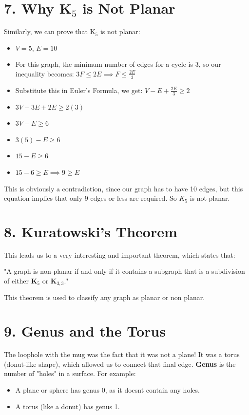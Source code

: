 \documentclass[12pt]{exam}
\begin{document}
\section*{7. Why K$_5$ is Not Planar}
Similarly, we can prove that K$_5$ is not planar:
\begin{itemize}
    \item $V = 5$, $E = 10$
    \item For this graph, the minimum number of edges for a cycle is 3, so our inequality becomes: $3F \leq 2E \implies F \leq \frac{2E}{3}$
    \item Substitute this in Euler's Formula, we get: $V - E + \frac{2E}{3} \geq 2$
    \item $3V - 3E + 2E \geq 2(3)$
    \item $3V - E \geq 6$
    \item $3(5) - E \geq 6$
    \item $15 - E \geq 6$
    \item $15 - 6 \geq E \implies 9 \geq E$
\end{itemize}
This is obviously a contradiction, since our graph has to have 10 edges, but this equation implies that only 9 edges or less are required. So $K_5$ is not planar.

\section*{8. Kuratowski's Theorem}
This leads us to a very interesting and important theorem, which states that:
\begin{center}
    "A graph is non-planar if and only if it contains a subgraph that is a subdivision of either \textbf{K$_5$} or \textbf{K$_{3,3}$}."
\end{center}
This theorem is used to classify any graph as planar or non planar.

\section*{9. Genus and the Torus}
The loophole with the mug was the fact that it was not a plane! It was a torus (donut-like shape), which allowed us to connect that final edge.
\textbf{Genus} is the number of "holes" in a surface. For example:
\begin{itemize}
    \item A plane or sphere has genus 0, as it doesnt contain any holes.
    \item A torus (like a donut) has genus 1. 
\end{itemize}
\end{document}
